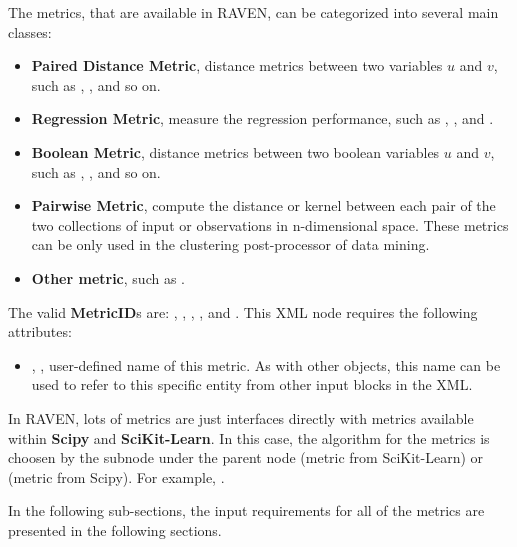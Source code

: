 The metrics, that are available in RAVEN, can be categorized into several main classes:
\begin{itemize}
  \item \textbf{Paired Distance Metric}, distance metrics between two variables $u$ and $v$, such as ,
    ,  and so on.
  \item \textbf{Regression Metric}, measure the regression performance, such as ,
    ,  and .
  \item \textbf{Boolean Metric}, distance metrics between two boolean variables $u$ and $v$, such as
    , ,  and so on.
  \item \textbf{Pairwise Metric}, compute the distance or kernel between each pair of the two collections of input
    or observations in n-dimensional space.
    \nb These metrics can be only used in the clustering post-processor of data mining. 
  \item \textbf{Other metric}, such as .
\end{itemize}

The valid \textbf{MetricID}s are: , , , ,
and . This XML node requires the following attributes:
\begin{itemize}
  \item {}, , user-defined name of this metric. \nb As with other
    objects, this name can be used to refer to this specific entity from other input blocks in the XML.
\end{itemize}

In RAVEN, lots of metrics are just interfaces directly with metrics available within \textbf{Scipy} and
\textbf{SciKit-Learn}. In this case, the algorithm for the metrics is choosen by the subnode 
under the parent node  (metric from SciKit-Learn) or  (metric from Scipy). For
example, .

In the following sub-sections, the input requirements for all of the metrics are presented in the following sections.

